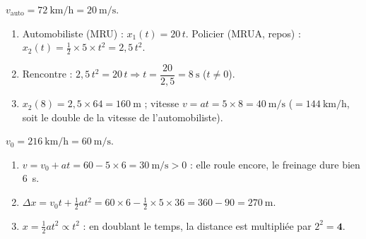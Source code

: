 \documentclass[11pt,a4paper]{article}
\begin{document}
\begin{corrige}
$v_{\text{auto}}=\qty{72}{\kilo\metre\per\hour}=\qty{20}{\metre\per\second}$.
\begin{enumerate}[label=\alph*)]
  \item Automobiliste (MRU) : $x_1(t)=20\,t$. Policier (MRUA, repos) : $x_2(t)=\tfrac12\times5\times t^2=2{,}5\,t^2$.
  \item Rencontre : $2{,}5\,t^2=20\,t \Rightarrow t=\dfrac{20}{2{,}5}=\qty{8}{\second}$ ($t\neq0$).
  \item $x_2(8)=2{,}5\times64=\qty{160}{\metre}$ ; vitesse $v=at=5\times8=\qty{40}{\metre\per\second}$ ($=\qty{144}{\kilo\metre\per\hour}$, soit le double de la vitesse de l'automobiliste).
\end{enumerate}
\end{corrige}

\begin{corrige}
$v_0=\qty{216}{\kilo\metre\per\hour}=\qty{60}{\metre\per\second}$.
\begin{enumerate}[label=\alph*)]
  \item $v=v_0+at=60-5\times6=\qty{30}{\metre\per\second}>0$ : elle roule encore, le freinage dure bien \qty{6}{\second}.
  \item $\Delta x=v_0t+\tfrac12 at^2=60\times6-\tfrac12\times5\times36=360-90=\qty{270}{\metre}$.
  \item $x=\tfrac12 a t^2\propto t^2$ : en doublant le temps, la distance est multipliée par $2^2=\mathbf{4}$.
\end{enumerate}
\end{corrige}
\end{document}
